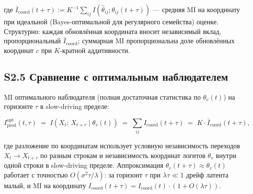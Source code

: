 \documentclass[pdflatex,sn-mathphys-ay]{sn-jnl}
\begin{document}
где \(\bar I_{\text{coord}}(t+\tau) := K^{-1} \sum_{ij} I(\hat\theta_{ij}; \theta_{ij}(t+\tau))\) --- средняя MI на координату при идеальной (Bayes-оптимальной для регулярного семейства) оценке. Структурно: каждая обновлённая координата вносит независимый вклад, пропорциональный \(\bar I_{\text{coord}}\); суммарная MI пропорциональна доле обновлённых координат \(c\) при \(K\)-кратной аддитивности.



\subsection*{S2.5 Сравнение с оптимальным наблюдателем}\label{s2.5-ux441ux440ux430ux432ux43dux435ux43dux438ux435-ux441-ux43eux43fux442ux438ux43cux430ux43bux44cux43dux44bux43c-ux43dux430ux431ux43bux44eux434ux430ux442ux435ux43bux435ux43c}



MI оптимального наблюдателя (полная достаточная статистика по \(\theta_v(t)\)) на горизонте \(\tau\) в slow-driving пределе:



\begin{equation}I_{\text{pred}}^{\text{opt}}(t, \tau) \;=\; I(X_t;\, X_{t+\tau} \mid \theta_v(t)) \;=\; \sum_{ij} I_{\text{coord}}(t+\tau) \;=\; K \cdot \bar I_{\text{coord}}(t+\tau), \tag{S2.4}\end{equation}



где разложение по координатам использует условную независимость переходов \(X_t \to X_{t+\tau}\) по разным строкам и независимость координат логитов \(\theta_v\) внутри одной строки в slow-driving пределе. Аппроксимация \(\theta_v(t+\tau) \approx \theta_v(t)\) работает с точностью \(O(\sigma^2 \tau /\lambda)\): за горизонт \(\tau\) при \(\lambda \tau \ll 1\) дрейф латента малый, и MI на координату \(I_{\text{coord}}(t+\tau) = I_{\text{coord}}(t) \cdot (1 + O(\lambda \tau))\).
\end{document}
